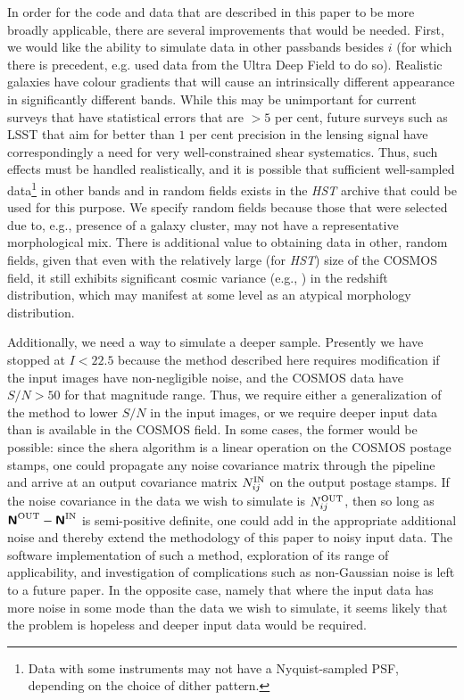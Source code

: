 \documentclass[twocolumn,useAMS,usenatbib]{mn2e}
\newcommand{\newtext}{}
\begin{document}
In order for the code and data that are described in this paper to be
more broadly applicable, there are several improvements that would be
needed.  First, we would like the ability to simulate data in other
passbands besides $i$ \newtext{(for which there is precedent, e.g. \citealt{2008APh....30...65F}
used data from the Ultra Deep Field to do so)}.  Realistic
galaxies have colour gradients that will cause an intrinsically
different appearance in significantly different bands.  While this may
be unimportant for current surveys that have statistical errors that
are $>5$ per cent, future surveys such as LSST that aim for better
than $1$ per cent precision in the lensing signal have correspondingly
a need for very well-constrained shear systematics.  Thus, such
effects must be handled realistically, and it is possible that
sufficient well-sampled data\footnote{Data with some instruments may
  not have a Nyquist-sampled PSF, depending on the choice of dither
  pattern.} in other bands and in random fields exists in the {\it HST}
archive that could be used for this purpose.  We specify random fields
because those that were selected due to, e.g., presence of a galaxy
cluster, may not have a representative morphological mix.  There is
additional value to obtaining data in other, random fields, given that
even with the relatively large (for {\it HST}) size of the COSMOS field, it
still exhibits significant cosmic variance (e.g.,
\citealt{2010ApJ...708..505K}) in the redshift distribution, which may
manifest at some level as an atypical morphology distribution.

Additionally, we need a way to simulate a deeper sample.  Presently we
have stopped at $I<22.5$ because the method described here requires
modification if the input images have non-negligible noise, and the
COSMOS data have $S/N>50$ for that magnitude range.  Thus, we require
either a generalization of the method to lower $S/N$ in the input
images, or we require deeper input data than is available in the
COSMOS field. \newtext{In some cases, the former would be possible: since the
{\sc shera} algorithm is a linear operation on the COSMOS postage stamps,
one could propagate any noise covariance matrix through the pipeline and arrive
at an output covariance matrix $N^{\rm IN}_{ij}$ on the output postage stamps.
If the noise covariance in the data we wish to simulate is $N^{\rm OUT}_{ij}$,
then so long as ${\textbf{\textsf{N}}}^{\rm OUT}-{\textbf{\textsf{N}}}^{\rm IN}$ is semi-positive
definite, one could add in the appropriate additional noise and thereby extend
the methodology of this paper to noisy input data. The software implementation of such a method, exploration of
its range of applicability, and investigation of complications such as
non-Gaussian noise is left to a future paper. In the opposite case, namely
that where the input data has more noise in some mode than the data we wish to
simulate, it seems likely that the problem is hopeless and deeper input data
would be required.}
\end{document}
